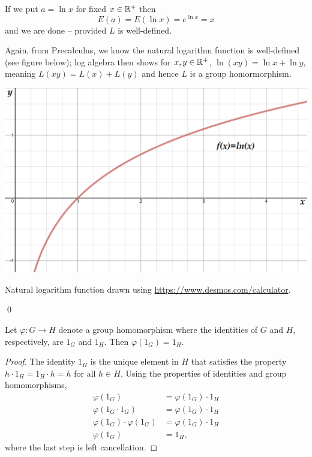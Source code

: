 \documentclass[../algebraNotesMSRI-UP2016.tex]{subfiles}
\begin{document}
\begin{frame}
If we put $a=\ln x$ for fixed $x\in\mathbb R^+$ then 
\[
E(a)=E(\ln x)=e^{\ln x}=x
\]
and we are done -- provided $L$ is well-defined.

\smallGap
Again, from Precalculus, we know the natural logarithm function is well-defined (see figure below); log algebra then shows for $x,y\in\mathbb R^+$, $\ln{(xy)}=\ln x+\ln y$, meaning $L(xy)=L(x)+L(y)$ and hence $L$ is a group homormorphism. 

\begin{center}
\includegraphics[scale=0.19]{lnFunction}

{\footnotesize Natural logarithm function drawn using \url{https://www.desmos.com/calculator}.}
\end{center}
\qed

\end{frame}

\begin{frame}
\begin{prop}\label{prop:homomorphismIdentities}
Let $\varphi: G\to H$ denote a group homomorphism where the identities of $G$ and $H$, respectively, are $1_G$ and $1_H$.  Then $\varphi(1_G)=1_H$.
\end{prop}

\smallGap
\begin{proof}
The identity $1_H$ is the unique element in $H$ that satisfies the property $h\cdot 1_H=1_H\cdot h=h$ for all $h\in H$.  Using the properties of identities and group homomorphisms,  
\begin{align*}
\varphi(1_G) &=\varphi(1_G)\cdot 1_H \\
\varphi(1_G\cdot 1_G) &= \varphi(1_G)\cdot 1_H \\
\varphi(1_G)\cdot\varphi(1_G) &= \varphi(1_G)\cdot 1_H \\
\varphi(1_G) &= 1_H,
\end{align*}
where the last step is left cancellation.
\end{proof}
\end{frame}
\end{document}
